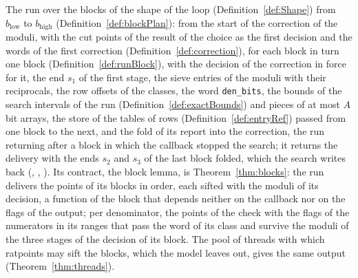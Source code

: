 \begin{definition}\label{def:sieveRun}
  \leanok
  The run over the blocks of the shape of the loop (Definition~\ref{def:Shape}) from
  $b_{\mathrm{low}}$ to $b_{\mathrm{high}}$ (Definition~\ref{def:blockPlan}): from the start of the
  correction of the moduli, with the cut points of the result of the choice as the first decision
  and the words of the first correction (Definition~\ref{def:correction}), for each block in turn
  one block (Definition~\ref{def:runBlock}), with the decision of the correction in force for it,
  the end $s_1$ of the first stage, the sieve entries of the moduli with their reciprocals, the row
  offsets of the classes, the word \verb|den_bits|, the bounds of the search intervals of the run
  (Definition~\ref{def:exactBounds}) and pieces of at most $A$ bit arrays, the store of the tables
  of rows (Definition~\ref{def:entryRef}) passed from one block to the next, and the fold of its
  report into the correction, the run returning after a block in which the callback stopped the
  search; it returns the delivery with the ends $s_2$ and $s_3$ of the last block folded, which the
  search writes back (, ,
  ). Its contract, the block lemma, is Theorem~\ref{thm:blocks}:
  the run delivers the points of its blocks in order, each sifted with the moduli of its decision, a
  function of the block that depends neither on the callback nor on the flags of the output; per
  denominator, the points of the check with the flags of the numerators in its ranges that pass the
  word of its class and survive the moduli of the three stages of the decision of its block. The
  pool of threads with which ratpoints may sift the blocks, which the model leaves out, gives the
  same output (Theorem~\ref{thm:threads}).
\end{definition}

